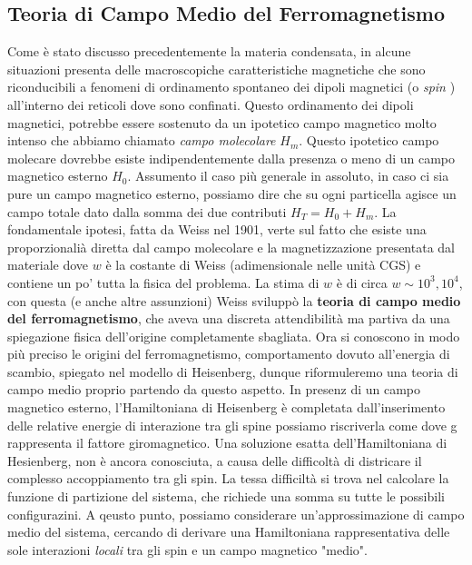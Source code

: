 \subsection{Teoria di Campo Medio del Ferromagnetismo}
Come \`e stato discusso precedentemente la materia condensata, in alcune situazioni presenta delle macroscopiche caratteristiche magnetiche che sono riconducibili a fenomeni di ordinamento spontaneo dei dipoli magnetici (o \textit{spin} ) all'interno dei reticoli dove sono confinati. Questo ordinamento dei dipoli magnetici, potrebbe essere sostenuto da un ipotetico campo magnetico molto intenso che abbiamo chiamato \textit{campo molecolare} $H_m$. Questo ipotetico campo molecare dovrebbe esiste indipendentemente dalla presenza o meno di un campo magnetico esterno $H_0$. Assumento il caso pi\`u generale in assoluto, in caso ci sia pure un campo magnetico esterno, possiamo dire che su ogni particella agisce un campo totale dato dalla somma dei due contributi $H_T = H_0 + H_m$. La fondamentale ipotesi, fatta da Weiss nel 1901, verte sul fatto che esiste una proporzionali\`a diretta dal campo molecolare e la magnetizzazione presentata dal materiale
dove $w$ \`e la costante di Weiss (adimensionale nelle unit\`a CGS) e contiene un po' tutta la fisica del problema. La stima di $w$ \`e di circa $w\sim10^3, 10^4$, con questa (e anche altre assunzioni) Weiss svilupp\`o la \textbf{teoria di campo medio del ferromagnetismo}, che aveva una discreta attendibilit\`a ma partiva da una spiegazione fisica dell'origine completamente sbagliata. Ora si conoscono in modo pi\`u preciso le origini del ferromagnetismo, comportamento dovuto all'energia di scambio, spiegato nel modello di Heisenberg, dunque riformuleremo una teoria di campo medio proprio partendo da questo aspetto. In presenz di un campo magnetico esterno, l'Hamiltoniana di Heisenberg \`e completata dall'inserimento delle relative energie di interazione tra gli spine possiamo riscriverla come
dove g rappresenta il fattore giromagnetico. Una soluzione esatta dell'Hamiltoniana di Hesienberg, non \`e ancora conosciuta, a causa delle difficolt\`a di districare il complesso accoppiamento tra gli spin. La tessa difficilt\`a si trova nel calcolare la funzione di partizione del sistema, che richiede una somma su tutte le possibili configurazini. A qeusto punto, possiamo considerare un'approssimazione di campo medio del sistema, cercando di derivare una Hamiltoniana rappresentativa delle sole interazioni \textit{locali} tra gli spin e un campo magnetico "medio". 

